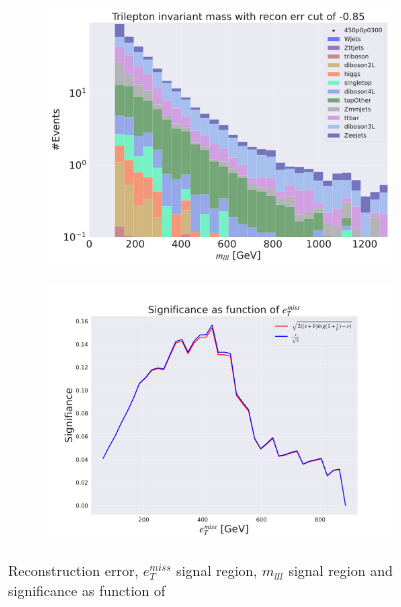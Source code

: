\begin{figure}[H]
    \hfill
    \begin{subfigure}{.40\textwidth}
        \includegraphics[width=\textwidth]{Figures/AE_testing/small/3lep/b_data_recon_big_rm3_feats_sig_450p0p0300_mlll_recon_errcut_-0.85.pdf}
        \caption{}
        \label{fig:AE_3lep_small_mlll_450_3}
    \end{subfigure}
    \hfill   
    \begin{subfigure}{.40\textwidth}
        \includegraphics[width=\textwidth]{Figures/AE_testing/small/3lep/significance_etmiss_450p0p0300_-0.8533980148308666.pdf}
        \caption{}
        \label{fig:AE_3lep_small_signi_450_3}
    \end{subfigure}
    \hfill      
    \caption[3lep shallow network | $450p300$ | AE | 3]{Reconstruction error, $e_T^{miss}$ signal region, $m_{lll}$ signal region and significance as function of 
}
\end{figure}
